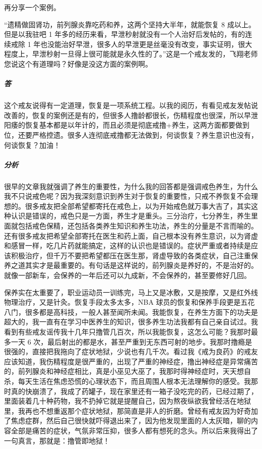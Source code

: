 再分享一个案例。

\begin{case}
    “遗精做固肾功，前列腺炎靠吃药和养，这两个坚持大半年，就能恢复 8 成以上。但是以我驻吧 1 年多的经历来看，早泄秒射就没有一个人治好后发帖的，有的连续戒除 1 年也没能治好早泄，很多人的早泄更是丝毫没有改变，事实证明，很大程度上，早泄秒射一旦得上很可能就是永久性的了。”这是一个戒友发的，飞翔老师您说这个有道理吗？好像是没这方面的案例啊。
    \subparagraph{答} 这个戒友说得有一定道理，恢复是一项系统工程。以我的阅历，有看见戒友发帖说改善的，恢复的案例还是有的，但很多人撸龄都很长，伤精程度也很深，所以早泄阳痿的恢复基本都是以年计的，而且必须是彻底戒撸+养生，这两方面都要做到位，还要严格控遗。很多人连彻底戒撸都无法做到，何谈恢复？养生意识也没有，何谈恢复？加油！
    \subparagraph{分析} 很早的文章我就强调了养生的重要性，为什么我的回答都是强调戒色养生，为什么我不只说戒色呢？因为我深刻意识到养生对于恢复的重要性，只戒不养恢复不会理想的。很多戒友把全部希望都寄托在戒色上，以为开始戒色就万事大吉了，其实这种认识是错误的，戒色只是一方面，养生才是重头。三分治疗，七分养生，养生里面就包括戒色保精，还包括各类养生知识和养生功法，养生的分量是不言而喻的。还有很多戒友把希望全部寄托在医生和药上面，自己根本没有养生意识，以为肾虚和感冒一样，吃几片药就能搞定，这样的认识也是错误的。症状严重或者持续是应该积极治疗，但千万不要把希望都压在医生那，肾虚导致的各类症状，自己注重保养之道其实才是最重要的。有句话是这样说的，前列腺炎是养好的，不是治好的。就像一部新车，会保养的一年后还可以九成新，不会保养的，甚至要修好几回。
\end{case}

保养实在太重要了，职业运动员一训练完，马上又是冰敷，又是按摩，又是红外线物理治疗，又是针灸。恢复手段太多太多，NBA 球员的恢复和保养手段更是五花八门，很多都是高科技，一般人甚至闻所未闻。我能恢复，在养生方面下的功夫是超大的，我一直有在学习中医养生的知识，很多养生功法我都有自己亲自试过。我看到有些戒友谣传我十几年只撸管几百次，所以我能恢复，这怎么可能？我那时最多一天 6 次，最后射出的都是水，甚至严重到无东西可射的地步。我那时撸瘾是很强的，直接把我拖向了症状地狱，少说也有几千次。看过我《戒为良药》的戒友应该知道，我伤精程度是很严重的，出现了严重的神经症，撸出神经症是异常痛苦的，前列腺炎和神经症相比，真是小巫见大巫了，我那时得神经症时，天天想自杀，每天生活在焦虑恐慌的心理状态下，而且周围人根本无法理解你的感受。我那时真的快崩溃了，我成了药罐子，现在家里还有一箱子没吃完的药，已经过期了，里面装着几十种药物，我不扔掉它就是提醒自己，因为熬夜纵欲我曾经活在地狱里，我再也不想重返那个症状地狱，那简直是非人的折磨。曾经有戒友因为好奇加了焦虑症群，然后自己很快就吓得退出来了，因为他发现里面的人太灰暗，聊的内容全部是痛苦的症状，气氛非常压抑，很多人都有想死的念头。所以后来我得出了一句真言，那就是：撸管即地狱！

